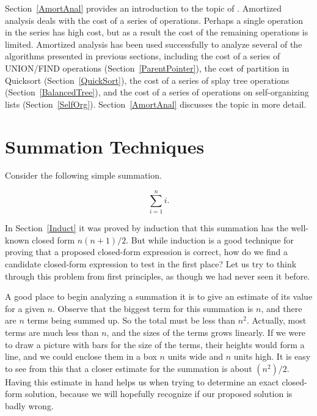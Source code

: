 Section~\ref{AmortAnal} provides an introduction to the topic of
.
Am\-or\-ti\-zed analysis deals with the cost of a series of operations.
Perhaps a single operation in the series has high cost,
but as a result the cost of the remaining operations is limited.
Amortized analysis has been used successfully to analyze several of
the algorithms presented in previous sections,
including the cost of a series of
UNION/FIND
operations (Section~\ref{ParentPointer}),
the cost of partition in Quicksort
(Section~\ref{QuickSort}),
the cost of a series of splay tree
operations (Section~\ref{BalancedTree}), and the cost of a
series of operations on
self-organizing lists
(Section~\ref{SelfOrg}).
Section~\ref{AmortAnal} discusses the topic in more detail.

\section{Summation Techniques}
\label{Summation}

Consider the following simple summation.

\[\sum_{i=1}^n i.\]

\noindent In Section~\ref{Induct} it was proved by induction that this
summation has the well-known closed form \(n(n+1)/2\).
But while induction is a good technique for proving that a proposed
closed-form expression is correct, 
how do we find a candidate closed-form expression to test in the first
place?
Let us try to think through this problem from first principles,
as though we had never seen it before.

A good place to begin analyzing a summation it is to give an
estimate of its value for a given \(n\).
Observe that the biggest term for this summation is \(n\),
and there are \(n\) terms being summed up.
So the total must be less than \(n^2\).
Actually, most terms are much less than \(n\), and
the sizes of the terms grows linearly.
If we were to draw a picture with bars for the size of the terms,
their heights would form a line, and we could enclose them in a box
\(n\) units wide and \(n\) units high.
It is easy to see from this that a closer estimate for the summation
is about \((n^2)/2\).
Having this estimate in hand helps us when trying to determine an
exact closed-form solution, because we will hopefully recognize if our
proposed solution is badly wrong.

